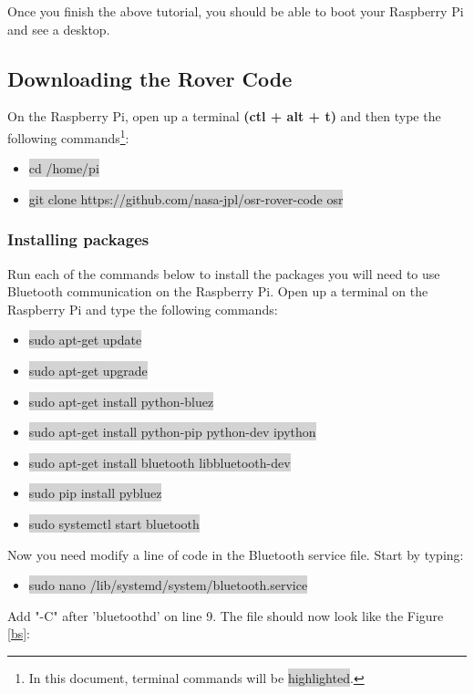 \documentclass[12pt]{article}
\begin{document}
Once you finish the above tutorial, you should be able to boot your Raspberry Pi and see a desktop.

\subsection{Downloading the Rover Code}
On the Raspberry Pi, open up a terminal \textbf{(ctl + alt + t)} and then type the following commands\footnote{In this document, terminal commands will be \colorbox{lightgray}{highlighted}.}:

\begin{itemize}
	\item[] \colorbox{lightgray}{cd /home/pi}
	\item[] \colorbox{lightgray}{git clone https://github.com/nasa-jpl/osr-rover-code osr}
\end{itemize}

\subsubsection{Installing packages}
Run each of the commands below to install the packages you will need to use Bluetooth communication on the Raspberry Pi. Open up a terminal on the Raspberry Pi  and type the following commands:
\begin{itemize}
	\item[] \colorbox{lightgray}{sudo apt-get update}
	\item[] \colorbox{lightgray}{sudo apt-get upgrade}
	\item[] \colorbox{lightgray}{sudo apt-get install python-bluez}
	\item[] \colorbox{lightgray}{sudo apt-get install python-pip python-dev ipython}
	\item[] \colorbox{lightgray}{sudo apt-get install bluetooth libbluetooth-dev}
	\item[] \colorbox{lightgray}{sudo pip install pybluez}
	\item[] \colorbox{lightgray}{sudo systemctl start bluetooth}

\end{itemize}

\noindent Now you need modify a line of code in the Bluetooth service file. Start by typing:
\begin{itemize}
	\item[] \colorbox{lightgray}{sudo nano /lib/systemd/system/bluetooth.service}
\end{itemize}
\noindent Add "-C" after 'bluetoothd' on line 9. The file should now look like the Figure \ref{bs}:
\end{document}
